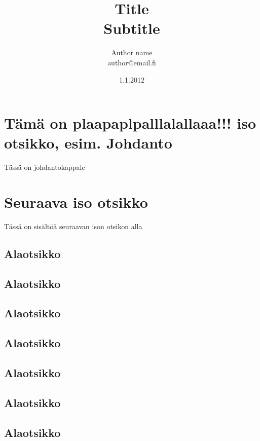 \documentclass[a4paper]{article}
\begin{document}
\title{\huge Title \\ \large Subtitle}
\date{1.1.2012}
\author{Author name \\ author@email.fi}
\maketitle

\large

\section{Tämä on plaapaplpalllalallaaa!!! iso otsikko, esim. Johdanto}

Tässä on johdantokappale

\section{Seuraava iso otsikko}

Tässä on sisältöä seuraavan ison otsikon alla

\subsection{Alaotsikko}

\subsection{Alaotsikko}

\subsection{Alaotsikko}

\subsection{Alaotsikko}

\subsection{Alaotsikko}

\subsection{Alaotsikko}
\subsection{Alaotsikko}
\end{document}
